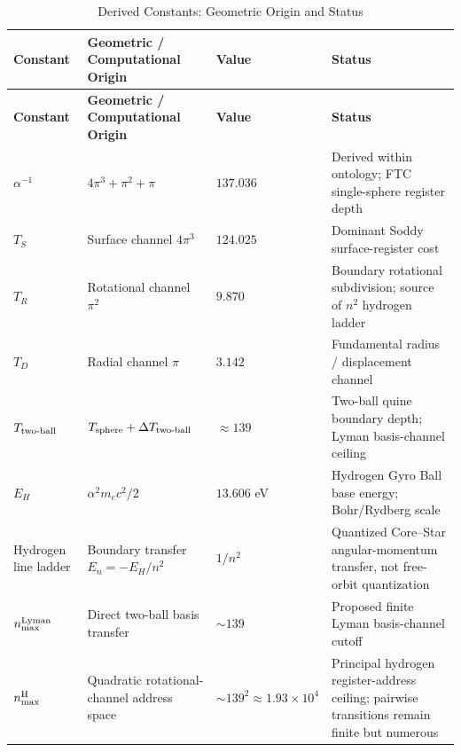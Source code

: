 \documentclass[11pt,a4paper]{article}
\begin{document}
\begin{longtable}{|p{2.8cm}|p{3.2cm}|p{2.2cm}|p{3.2cm}|}
\caption{Derived Constants: Geometric Origin and Status}\\
\hline
\textbf{Constant} & \textbf{Geometric / Computational Origin} & \textbf{Value} &
  \textbf{Status}\\
\hline\endfirsthead
\hline
\textbf{Constant} & \textbf{Geometric / Computational Origin} & \textbf{Value} &
  \textbf{Status}\\
\hline\endhead
\hline\endfoot
\hline\endlastfoot

$\alpha^{-1}$          
  & $4\pi^3+\pi^2+\pi$               
  & $137.036$
  & Derived within ontology; FTC single-sphere register depth \\
\hline

$T_S$                  
  & Surface channel $4\pi^3$          
  & $124.025$
  & Dominant Soddy surface-register cost \\
\hline

$T_R$                  
  & Rotational channel $\pi^2$        
  & $9.870$
  & Boundary rotational subdivision; source of $n^2$ hydrogen ladder \\
\hline

$T_D$                  
  & Radial channel $\pi$              
  & $3.142$
  & Fundamental radius / displacement channel \\
\hline

$T_{\rm two\text{-}ball}$ 
  & $T_{\rm sphere}+\Delta T_{\rm two\text{-}ball}$
  & $\approx139$
  & Two-ball quine boundary depth; Lyman basis-channel ceiling \\
\hline

$E_H$                  
  & $\alpha^2 m_e c^2/2$             
  & $13.606$ eV
  & Hydrogen Gyro Ball base energy; Bohr/Rydberg scale \\
\hline

Hydrogen line ladder   
  & Boundary transfer $E_n=-E_H/n^2$  
  & $1/n^2$
  & Quantized Core--Star angular-momentum transfer, not free-orbit quantization \\
\hline

$n_{\max}^{\rm Lyman}$ 
  & Direct two-ball basis transfer    
  & $\sim139$
  & Proposed finite Lyman basis-channel cutoff \\
\hline

$n_{\max}^{\rm H}$     
  & Quadratic rotational-channel address space
  & $\sim139^2\approx1.93\times10^4$
  & Principal hydrogen register-address ceiling; pairwise transitions remain finite but numerous \\
\hline


\end{longtable}
\end{document}

